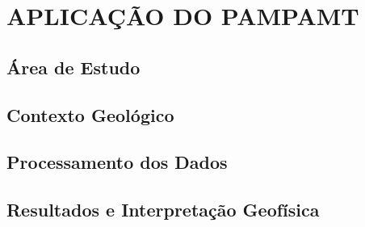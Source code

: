 \chapter{APLICAÇÃO DO PAMPAMT}
    
    \section{Área de Estudo}
        
    \section{Contexto Geológico}
        
    \section{Processamento dos Dados}
        
    \section{Resultados e Interpretação Geofísica}
        
        
